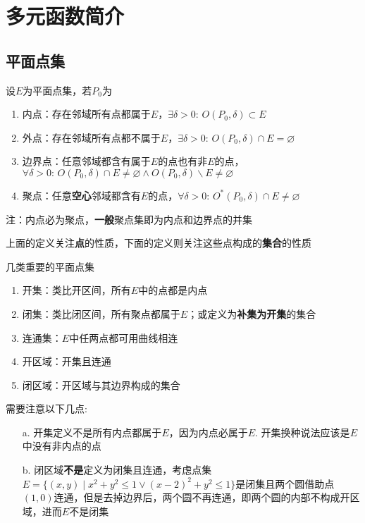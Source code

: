 
\section{多元函数简介}
\subsection{平面点集}
\begin{definition}
设$E$为平面点集，若$P_0$为
\begin{enumerate}
	\itemsep -3pt
	\item 内点：存在邻域所有点都属于$E$，$\exists\delta>0:\,O(P_0,\delta)\subset E$
	\item 外点：存在邻域所有点都不属于$E$，$\exists\delta>0:\,O(P_0,\delta)\cap E=\varnothing$
	\item 边界点：任意邻域都含有属于$E$的点也有非$E$的点，$\forall\delta>0:\,O(P_0,\delta)\cap E\ne\varnothing \land O(P_0,\delta)\backslash E\ne\varnothing$
	\item 聚点：任意\textbf{空心}邻域都含有$E$的点，$\forall\delta>0:\,O^*(P_0,\delta)\cap E\ne\varnothing$
\end{enumerate}
注：内点必为聚点，\textbf{一般}聚点集即为内点和边界点的并集
\end{definition}
上面的定义关注\textbf{点}的性质，下面的定义则关注这些点构成的\textbf{集合}的性质
\begin{definition}
几类重要的平面点集
\begin{enumerate}
	\itemsep -3pt
	\item 开集：类比开区间，所有$E$中的点都是内点
	\item 闭集：类比闭区间，所有聚点都属于$E$；或定义为\textbf{补集为开集}的集合
	\item 连通集：$E$中任两点都可用曲线相连
	\item 开区域：开集且连通
	\item 闭区域：开区域与其边界构成的集合
\end{enumerate}
需要注意以下几点:
\begin{enumerate}
	\itemsep -3pt
	\item[a.] 开集定义不是所有内点都属于$E$，因为内点必属于$E$. 开集换种说法应该是$E$中没有非内点的点
	\item[b.] 闭区域\textbf{不是}定义为闭集且连通，考虑点集$E=\{(x,y)\mid x^2+y^2\leq 1\lor (x-2)^2+y^2\leq 1\}$是闭集且两个圆借助点$(1,0)$连通，但是去掉边界后，两个圆不再连通，即两个圆的内部不构成开区域，进而$E$不是闭集
\end{enumerate}
\end{definition}
